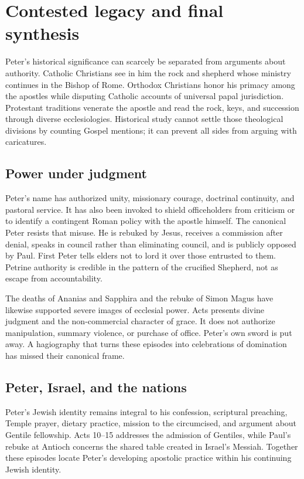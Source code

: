 \section{Contested legacy and final synthesis}\label{sec:peter-synthesis}

Peter's historical significance can scarcely be separated from arguments
about authority. Catholic Christians see in him the rock and shepherd whose
ministry continues in the Bishop of Rome. Orthodox Christians honor his
primacy among the apostles while disputing Catholic accounts of universal
papal jurisdiction. Protestant traditions venerate the apostle and read the
rock, keys, and succession through diverse ecclesiologies. Historical study
cannot settle those theological divisions by counting Gospel mentions; it can
prevent all sides from arguing with caricatures.

\subsection{Power under judgment}

Peter's name has authorized unity, missionary courage, doctrinal continuity,
and pastoral service. It has also been invoked to shield officeholders from
criticism or to identify a contingent Roman policy with the apostle himself.
The canonical Peter resists that misuse. He is rebuked by Jesus, receives a
commission after denial, speaks in council rather than eliminating council,
and is publicly opposed by Paul. First Peter tells elders not to lord it over
those entrusted to them. Petrine authority is credible in the pattern of the
crucified Shepherd, not as escape from accountability.

The deaths of Ananias and Sapphira and the rebuke of Simon Magus have likewise
supported severe images of ecclesial power. Acts presents divine judgment and
the non-commercial character of grace. It does not authorize manipulation,
summary violence, or purchase of office. Peter's own sword is put away. A
hagiography that turns these episodes into celebrations of domination has
missed their canonical frame.

\subsection{Peter, Israel, and the nations}

Peter's Jewish identity remains integral to his confession, scriptural
preaching, Temple prayer, dietary practice, mission to the circumcised, and
argument about Gentile fellowship. Acts 10--15 addresses the admission of
Gentiles, while Paul's rebuke at Antioch concerns the shared table created in
Israel's Messiah. Together these episodes locate Peter's developing apostolic
practice within his continuing Jewish identity.


